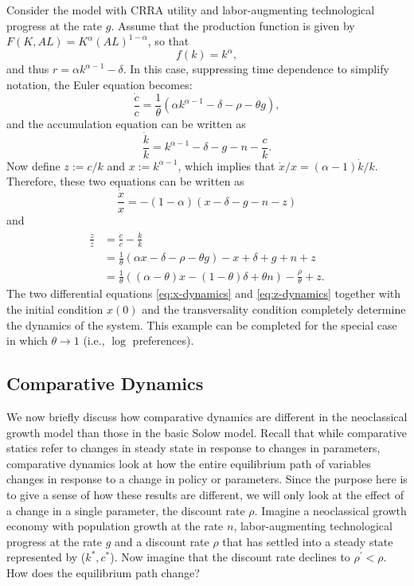 \documentclass[\topdir/lecture\_notes.tex]{subfiles}
\begin{document}
\begin{example}
  Consider the model with CRRA utility and labor-augmenting technological progress at the rate $g$. Assume that the production function is given by $F(K, A L)= K^{\alpha}(A L)^{1-\alpha}$, so that
  \[
    f(k)=k^{\alpha},
  \]
  and thus $r=\alpha k^{\alpha-1}-\delta$. In this case, suppressing time dependence to simplify notation, the Euler equation becomes:
  \[
    \frac{\dot{c}}{c}=\frac{1}{\theta}\left(\alpha k^{\alpha-1}-\delta-\rho-\theta g\right),
  \]
  and the accumulation equation can be written as
  \[
    \frac{\dot{k}}{k}=k^{\alpha-1}-\delta-g-n-\frac{c}{k}.
  \]
  Now define $z := c / k$ and $x := k^{\alpha-1}$, which implies that $\dot{x} / x=(\alpha-1) \dot{k} / k$. Therefore, these two equations can be written as
  \begin{equation}
    \frac{\dot{x}}{x}=-(1-\alpha)(x-\delta-g-n-z) \label{eq:x-dynamics}
  \end{equation}
  and
  \begin{equation}
    \begin{aligned}
      \frac{\dot{z}}{z} & = \frac{\dot{c}}{c}-\frac{\dot{k}}{k}                                                 \\
                        & =\frac{1}{\theta}(\alpha x-\delta-\rho-\theta g)-x+\delta+g+n+z                       \\
                        & =\frac{1}{\theta}((\alpha-\theta) x-(1-\theta) \delta+\theta n)-\frac{\rho}{\theta}+z.
    \end{aligned}
    \label{eq:z-dynamics}
  \end{equation}
  The two differential equations \eqref{eq:x-dynamics} and \eqref{eq:z-dynamics} together with the initial condition $x(0)$ and the transversality condition completely determine the dynamics of the system. This example can be completed for the special case in which $\theta \rightarrow 1$ (i.e., $\log$ preferences).
\end{example}

\subsection{Comparative Dynamics}
We now briefly discuss how comparative dynamics are different in the neoclassical growth model than those in the basic Solow model. Recall that while comparative statics refer to changes in steady state in response to changes in parameters, comparative dynamics look at how the entire equilibrium path of variables changes in response to a change in policy or parameters. Since the purpose here is to give a sense of how these results are different, we will only look at the effect of a change in a single parameter, the discount rate $\rho$. Imagine a neoclassical growth economy with population growth at the rate $n$, labor-augmenting technological progress at the rate $g$ and a discount rate $\rho$ that has settled into a steady state
represented by ($k^{*}, c^{*}$). Now imagine that the discount rate declines to $\rho^{\prime}<\rho$. How does the equilibrium path change?
\end{document}
